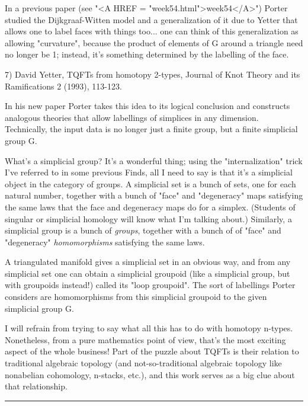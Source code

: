 In a previous paper (see "<A HREF = "week54.html">week54</A>") Porter studied the Dijkgraaf-Witten 
model and a generalization of it due to Yetter that allows one to label 
faces with things too... one can think of this generalization as 
allowing "curvature", because the product of elements of
G around a triangle need no longer be 1; instead, it's something 
determined by the labelling of the face.  

7) David Yetter, TQFTs from homotopy 2-types, Journal of Knot Theory and its 
Ramifications 2 (1993), 113-123.

In his new paper Porter takes this idea to its logical conclusion and 
constructs analogous theories that allow labellings of simplices in any 
dimension.  Technically, the input data is no longer just a finite group, 
but a finite simplicial group G.  

What's a simplicial group?  It's a wonderful thing; 
using the "internalization" trick I've referred to in some previous Finds, 
all I need to say is that it's a simplicial object in the category of 
groups.  A simplicial set is a bunch of sets, one for each natural 
number, together with a bunch of "face" and "degeneracy" maps satisfying
the same laws that the face and degeneracy maps do for a simplex.  
(Students of singular or simplicial homology will know what I'm 
talking about.)  Similarly, a simplicial group is a bunch of 
\emph{groups}, 
together with a bunch of of "face" and "degeneracy" \emph{homomorphisms}
satisfying the same laws.  

A triangulated manifold gives a simplicial set in an obvious way, and 
from any simplicial set one can obtain a simplicial groupoid (like a 
simplicial group, but with groupoids instead!) called its "loop 
groupoid".  The sort of labellings Porter considers are homomorphisms
from this simplicial groupoid to the given simplicial group G.

I will refrain from trying to say what all this has to do with 
homotopy n-types.  Nonetheless, from a pure mathematics point of view, 
that's the most exciting aspect of the whole business!
Part of the puzzle about TQFTs is their relation to traditional 
algebraic topology (and not-so-traditional algebraic topology like 
nonabelian cohomology, n-stacks, etc.), and this work 
serves as a big clue about that relationship.  


\par\noindent\rule{\textwidth}{0.4pt}
